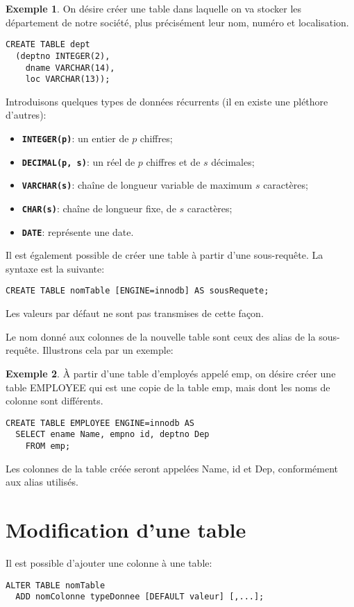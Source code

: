 \documentclass[a4paper, 12pt]{report}
\newcommand{\textSQL}[1]{\texttt{\textbf{#1}}}
\theoremstyle{definition} \newtheorem{ex}{Exemple}
\begin{document}
\begin{ex}
On désire créer une table dans laquelle on va stocker les département de notre société, plus précisément leur nom, numéro et localisation.
\begin{lstlisting}[frame=single]
CREATE TABLE dept
  (deptno INTEGER(2),
	dname VARCHAR(14),
	loc VARCHAR(13));
\end{lstlisting}
\end{ex}
Introduisons quelques types de données récurrents (il en existe une pléthore d'autres):
\begin{itemize}
\item \textSQL{INTEGER(p)}: un entier de $p$ chiffres;
\item \textSQL{DECIMAL(p, s)}: un réel de $p$ chiffres et de $s$ décimales;
\item \textSQL{VARCHAR(s)}: chaîne de longueur variable de maximum $s$ caractères;
\item \textSQL{CHAR(s)}: chaîne de longueur fixe, de $s$ caractères;
\item \textSQL{DATE}: représente une date.
\end{itemize}

Il est également possible de créer une table à partir d'une sous-requête. La syntaxe est la suivante:
\begin{lstlisting}[frame=single]
CREATE TABLE nomTable [ENGINE=innodb] AS sousRequete;
\end{lstlisting}
Les valeurs par défaut ne sont pas transmises de cette façon.

Le nom donné aux colonnes de la nouvelle table sont ceux des alias de la sous-requête. Illustrons cela par un exemple:
\begin{ex}
\`A partir d'une table d'employés appelé emp, on désire créer une table EMPLOYEE qui est une copie de la table emp, mais dont les noms de colonne sont différents.
\begin{lstlisting}[frame=single]
CREATE TABLE EMPLOYEE ENGINE=innodb AS
  SELECT ename Name, empno id, deptno Dep
	FROM emp;
\end{lstlisting}
Les colonnes de la table créée seront appelées Name, id et Dep, conformément aux alias utilisés.
\end{ex}

\section{Modification d'une table}
Il est possible d'ajouter une colonne à une table:
\begin{lstlisting}[frame=single]
ALTER TABLE nomTable
  ADD nomColonne typeDonnee [DEFAULT valeur] [,...];
\end{lstlisting}
\end{document}
